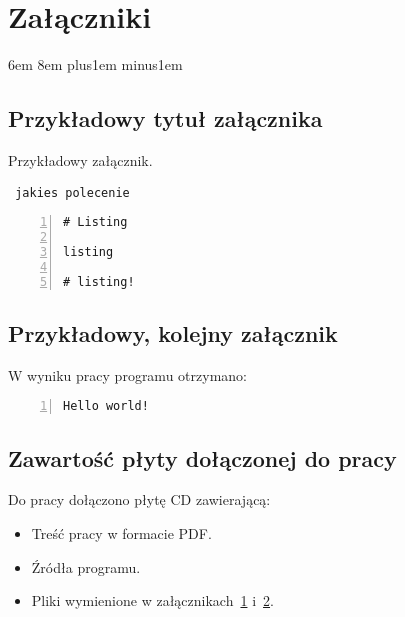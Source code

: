 
\part*{Załączniki}
\appendix

	{6em}
	{}
	{8em plus1em minus1em}

\chapter{Przykładowy tytuł załącznika}
\label{app:zal1}

Przykładowy załącznik.

\begin{verbatim}
 jakies polecenie
\end{verbatim}

\begin{lstlisting}[basicstyle=\footnotesize\tt, numbers=left, numberstyle=\tiny,
numberfirstline=true, captionpos=t, caption=Plik \texttt{plik1.txt}]
# Listing

listing

# listing!
\end{lstlisting}

\chapter{Przykładowy, kolejny załącznik}
\label{app:zal_x}


W wyniku pracy programu otrzymano:

\begin{lstlisting}[basicstyle=\scriptsize\tt, numbers=left, numberstyle=\tiny,
tabsize=2, numberfirstline=true, captionpos=t, caption=Plik \texttt{wynik.txt}]
Hello world!
\end{lstlisting}

\chapter{Zawartość płyty dołączonej do pracy}
\label{app:cd}

\begin{large}
\noindent Do pracy dołączono płytę CD zawierającą:
\begin{itemize}
	\renewcommand{\labelitemi}{$\bullet$}
	\item Treść pracy w formacie PDF.
	\item Źródła programu.
	\item Pliki wymienione w załącznikach~\ref{app:zal1} i~\ref{app:zal_x}.
\end{itemize}
\end{large}
